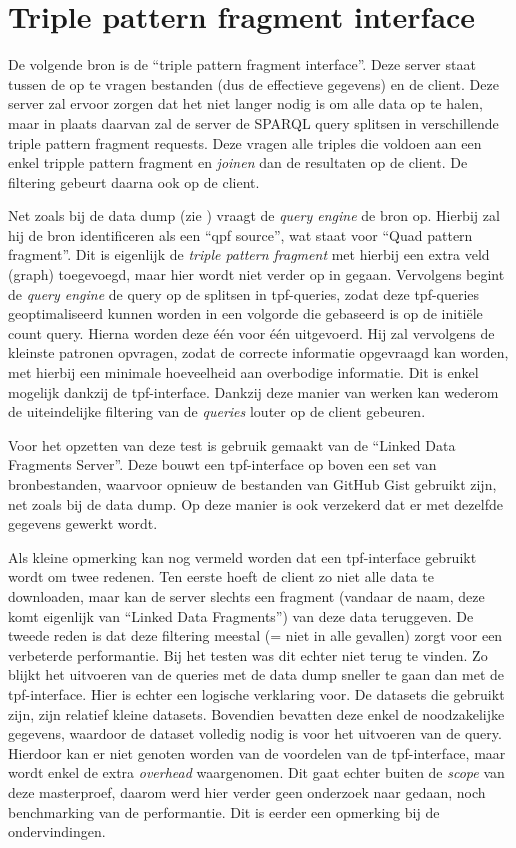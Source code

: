 \section{Triple pattern fragment interface}
\label{sec:impl_tpf_interface}
De volgende bron is de ``triple pattern fragment interface''. Deze server staat tussen de op te vragen bestanden (dus de effectieve gegevens) en de client. Deze server zal ervoor zorgen dat het niet langer nodig is om alle data op te halen, maar in plaats daarvan zal de server de SPARQL query splitsen in verschillende triple pattern fragment requests. Deze vragen alle triples die voldoen aan een enkel tripple pattern fragment en \textit{joinen} dan de resultaten op de client. De filtering gebeurt daarna ook op de client.

Net zoals bij de data dump (zie ) vraagt de \textit{query engine} de bron op. Hierbij zal hij de bron identificeren als een ``qpf source'', wat staat voor ``Quad pattern fragment''. Dit is eigenlijk de \textit{triple pattern fragment} met hierbij een extra veld (graph) toegevoegd, maar hier wordt niet verder op in gegaan. Vervolgens begint de \textit{query engine} de query op de splitsen in \acrfull{tpf}-queries, zodat deze \acrshort{tpf}-queries geoptimaliseerd kunnen worden in een volgorde die gebaseerd is op de initiële count query. Hierna worden deze één voor één uitgevoerd. Hij zal vervolgens de kleinste patronen opvragen, zodat de correcte informatie opgevraagd kan worden, met hierbij een minimale hoeveelheid aan overbodige informatie. Dit is enkel mogelijk dankzij de \acrshort{tpf}-interface. Dankzij deze manier van werken kan wederom de uiteindelijke filtering van de \textit{queries} louter op de client gebeuren.

Voor het opzetten van deze test is gebruik gemaakt van de ``Linked Data Fragments Server''. Deze bouwt een \acrshort{tpf}-interface op boven een set van bronbestanden, waarvoor opnieuw de bestanden van GitHub Gist gebruikt zijn, net zoals bij de data dump. Op deze manier is ook verzekerd dat er met dezelfde gegevens gewerkt wordt. 

Als kleine opmerking kan nog vermeld worden dat een \acrshort{tpf}-interface gebruikt wordt om twee redenen. Ten eerste hoeft de client zo niet alle data te downloaden, maar kan de server slechts een fragment (vandaar de naam, deze komt eigenlijk van ``Linked Data Fragments'') van deze data teruggeven. De tweede reden is dat deze filtering meestal (= niet in alle gevallen) zorgt voor een verbeterde performantie. Bij het testen was dit echter niet terug te vinden. Zo blijkt het uitvoeren van de queries met de data dump sneller te gaan dan met de \acrshort{tpf}-interface. Hier is echter een logische verklaring voor. De datasets die gebruikt zijn, zijn relatief kleine datasets. Bovendien bevatten deze enkel de noodzakelijke gegevens, waardoor de dataset volledig nodig is voor het uitvoeren van de query. Hierdoor kan er niet genoten worden van de voordelen van de \acrshort{tpf}-interface, maar wordt enkel de extra \textit{overhead} waargenomen. Dit gaat echter buiten de \textit{scope} van deze masterproef, daarom werd hier verder geen onderzoek naar gedaan, noch benchmarking van de performantie. Dit is eerder een opmerking bij de ondervindingen.